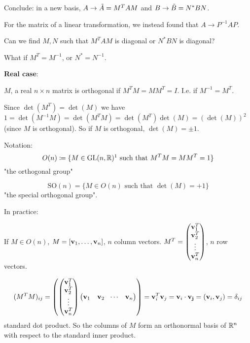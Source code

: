 \documentclass[10pt, a4paper]{article}
\begin{document}
Conclude:
in a new basis,
$A \rightarrow \Tilde{A} = M ^ TAM$ and $B \rightarrow \Tilde{B} = N ^ {*}BN$.

\begin{remark}
    For the matrix of a linear transformation,
    we instead found that $A \rightarrow P ^ {-1}AP$.
\end{remark}

Can we find $M, N$ such that $M ^ TAM$ is diagonal or $N ^ {*}BN$ is diagonal?

What if $M ^ T = M ^ {-1}$,
or $N ^ {*} = N ^ {-1}$.

\textbf{Real case}:

\begin{definition}
    $M$,
    a real $n \times n$ matrix is orthogonal if $M ^ TM = MM ^ T = I$.
    I.e. if $M ^ {-1} = M ^ T$.
\end{definition}

\begin{remark}
    Since $\det(M ^ T) = \det(M)$ we have $1 = \det(M ^ {-1}M) = \det(M ^ TM) = \det(M ^ T)\det(M) = (\det(M)) ^ 2$
    (since $M$ is orthogonal).
    So if $M$ is orthogonal,
    $\det(M) = \pm 1$.
\end{remark}

Notation:
\[
O(n) \coloneqq \{M \in \mathrm{GL}(n, \R)\footnotemark\text{ such that } M ^ TM = MM ^ T = 1\}
\]
"the orthogonal group"

\[
\mathrm{SO}(n) = \{M \in O(n)\text{ such that } \det(M) = +1\}
\]
"the special orthogonal group".

In practice:

If $M \in O(n)$,
$M = [\mathbf{v}_1, \dotsc, \mathbf{v}_n]$,
$n$ column vectors.
$M ^ T = \begin{pmatrix}
    \mathbf{v}_1 ^ T \\
    \mathbf{v}_2 ^ T \\
    \vdots \\
    \mathbf{v}_n ^ T
\end{pmatrix}$,
$n$ row vectors.

\[
(M ^ TM)_{ij} = \left(\begin{pmatrix}
    \mathbf{v}_1 ^ T \\
    \mathbf{v}_2 ^ T \\
    \vdots \\
    \mathbf{v}_n ^ T
\end{pmatrix}\begin{pmatrix}
    \mathbf{v}_1 & \mathbf{v}_2 & \dotsi & \mathbf{v}_n
\end{pmatrix}\right) = \mathbf{v}_i ^ T\mathbf{v}_j = \mathbf{v}_i \cdot \mathbf{v_j} = (\mathbf{v}_i, \mathbf{v}_j) = \delta_{ij}
\]
standard dot product.
So the columns of $M$ form an orthonormal basis of $\mathbb{R} ^ n$ with respect to the standard inner product.
\end{document}
